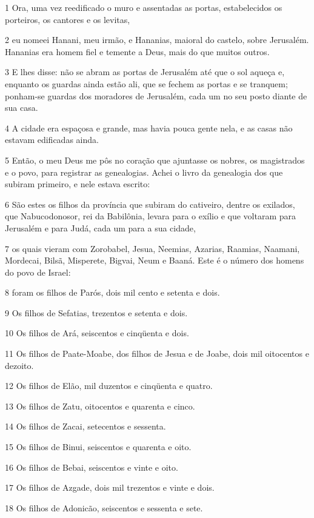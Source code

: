 \par 1 Ora, uma vez reedificado o muro e assentadas as portas, estabelecidos os porteiros, os cantores e os levitas,
\par 2 eu nomeei Hanani, meu irmão, e Hananias, maioral do castelo, sobre Jerusalém. Hananias era homem fiel e temente a Deus, mais do que muitos outros.
\par 3 E lhes disse: não se abram as portas de Jerusalém até que o sol aqueça e, enquanto os guardas ainda estão ali, que se fechem as portas e se tranquem; ponham-se guardas dos moradores de Jerusalém, cada um no seu posto diante de sua casa.
\par 4 A cidade era espaçosa e grande, mas havia pouca gente nela, e as casas não estavam edificadas ainda.
\par 5 Então, o meu Deus me pôs no coração que ajuntasse os nobres, os magistrados e o povo, para registrar as genealogias. Achei o livro da genealogia dos que subiram primeiro, e nele estava escrito:
\par 6 São estes os filhos da província que subiram do cativeiro, dentre os exilados, que Nabucodonosor, rei da Babilônia, levara para o exílio e que voltaram para Jerusalém e para Judá, cada um para a sua cidade,
\par 7 os quais vieram com Zorobabel, Jesua, Neemias, Azarias, Raamias, Naamani, Mordecai, Bilsã, Misperete, Bigvai, Neum e Baaná. Este é o número dos homens do povo de Israel:
\par 8 foram os filhos de Parós, dois mil cento e setenta e dois.
\par 9 Os filhos de Sefatias, trezentos e setenta e dois.
\par 10 Os filhos de Ará, seiscentos e cinqüenta e dois.
\par 11 Os filhos de Paate-Moabe, dos filhos de Jesua e de Joabe, dois mil oitocentos e dezoito.
\par 12 Os filhos de Elão, mil duzentos e cinqüenta e quatro.
\par 13 Os filhos de Zatu, oitocentos e quarenta e cinco.
\par 14 Os filhos de Zacai, setecentos e sessenta.
\par 15 Os filhos de Binui, seiscentos e quarenta e oito.
\par 16 Os filhos de Bebai, seiscentos e vinte e oito.
\par 17 Os filhos de Azgade, dois mil trezentos e vinte e dois.
\par 18 Os filhos de Adonicão, seiscentos e sessenta e sete.
